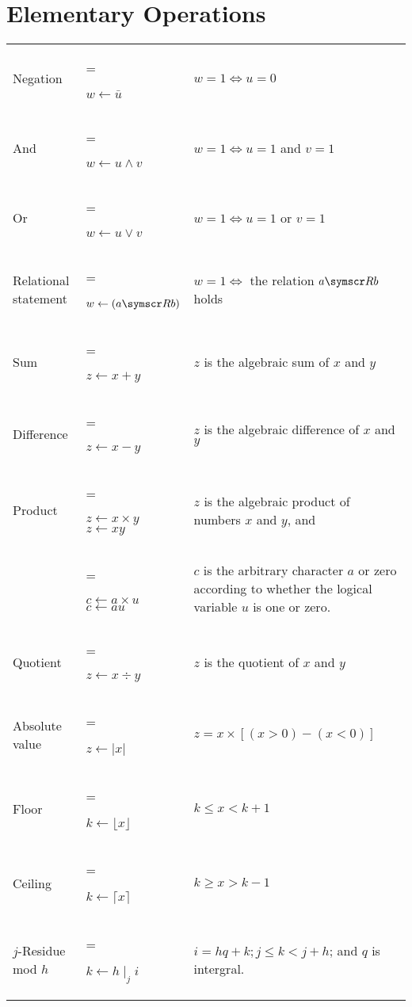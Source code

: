 \section{Elementary Operations}
\begin{tabularx}{\textwidth}{
	l
	>{\hsize=0.5\hsize\linewidth=\hsize\raggedright\arraybackslash}X
	X }
Negation
	& \( w \gets \bar{u} \)
	& \( w = 1 \iff u = 0 \)
	\\
And
	& \( w \gets u \land v \)
	& \( w = 1 \iff u = 1 \) and \( v = 1 \)
	\\
Or
	& \( w \gets u \lor v \)
	& \( w= 1 \iff u = 1 \) or \( v = 1 \)
	\\
Relational statement
	& \( w \gets (a \relsym b) \)
	& \( w = 1 \iff \) the relation \( a \relsym b \) holds
	\\
Sum
	& \( z \gets x + y \)
	& \( z \) is the algebraic sum of \( x \) and \( y \)
	\\
Difference
	& \( z \gets x − y \)
	& \( z \) is the algebraic difference of \(x\) and \(y\)
	\\
Product
	& \( z \gets x \times y \) \newline \( z \gets xy \)
	& \(z\) is the algebraic product of numbers \(x\) and \(y\), and
	\\
	& \( c \gets a \times u \) \newline \( c \gets au \)
	& \(c\) is the arbitrary character \(a\) or zero according to whether the logical variable \(u\) is one or zero.
	\\
Quotient
	& \( z \gets x \div y \)
	& \(z\) is the quotient of \(x\) and \(y\)
	\\
Absolute value
	& \( z \gets \lvert x \rvert \)
	& \( z = x \times [(x > 0) − (x < 0)] \)
	\\
Floor
	& \( k \gets \lfloor x \rfloor \)
	& \( k \leq x < k + 1 \)
	\\
Ceiling
	& \( k \gets \lceil x \rceil \)
	& \( k \geq x > k − 1 \)
	\\
\( j \)-Residue mod \( h \)
	& \( k \gets h \mid_j i \)
	& \( i = hq + k; j \leq k < j + h \); and \( q \) is intergral.
	\\
\end{tabularx}

